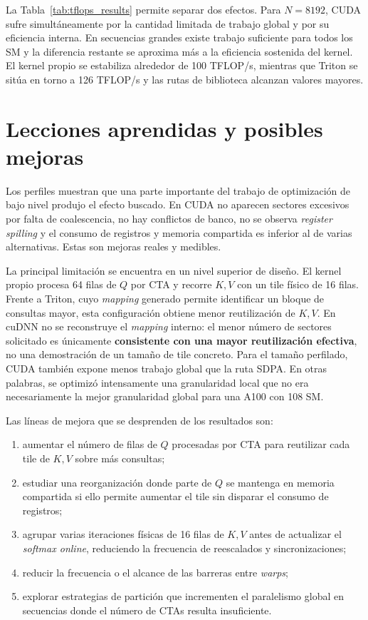 La Tabla~\ref{tab:tflops_results} permite separar dos efectos. Para \(N=8192\), CUDA sufre simultáneamente por la cantidad limitada de trabajo global y por su eficiencia interna. En secuencias grandes existe trabajo suficiente para todos los SM y la diferencia restante se aproxima más a la eficiencia sostenida del kernel. El kernel propio se estabiliza alrededor de 100 TFLOP/s, mientras que Triton se sitúa en torno a 126 TFLOP/s y las rutas de biblioteca alcanzan valores mayores.

\section{Lecciones aprendidas y posibles mejoras}

Los perfiles muestran que una parte importante del trabajo de optimización de bajo nivel produjo el efecto buscado. En CUDA no aparecen sectores excesivos por falta de coalescencia, no hay conflictos de banco, no se observa \textit{register spilling} y el consumo de registros y memoria compartida es inferior al de varias alternativas. Estas son mejoras reales y medibles.

La principal limitación se encuentra en un nivel superior de diseño. El kernel propio procesa 64 filas de \(Q\) por CTA y recorre \(K,V\) con un tile físico de 16 filas. Frente a Triton, cuyo \textit{mapping} generado permite identificar un bloque de consultas mayor, esta configuración obtiene menor reutilización de \(K,V\). En cuDNN no se reconstruye el \textit{mapping} interno: el menor número de sectores solicitado es únicamente \textbf{consistente con una mayor reutilización efectiva}, no una demostración de un tamaño de tile concreto. Para el tamaño perfilado, CUDA también expone menos trabajo global que la ruta SDPA. En otras palabras, se optimizó intensamente una granularidad local que no era necesariamente la mejor granularidad global para una A100 con 108 SM.

Las líneas de mejora que se desprenden de los resultados son:

\begin{enumerate}
    \item aumentar el número de filas de \(Q\) procesadas por CTA para reutilizar cada tile de \(K,V\) sobre más consultas;
    \item estudiar una reorganización donde parte de \(Q\) se mantenga en memoria compartida si ello permite aumentar el tile sin disparar el consumo de registros;
    \item agrupar varias iteraciones físicas de 16 filas de \(K,V\) antes de actualizar el \textit{softmax online}, reduciendo la frecuencia de reescalados y sincronizaciones;
    \item reducir la frecuencia o el alcance de las barreras entre \textit{warps};
    \item explorar estrategias de partición que incrementen el paralelismo global en secuencias donde el número de CTAs resulta insuficiente.
\end{enumerate}

